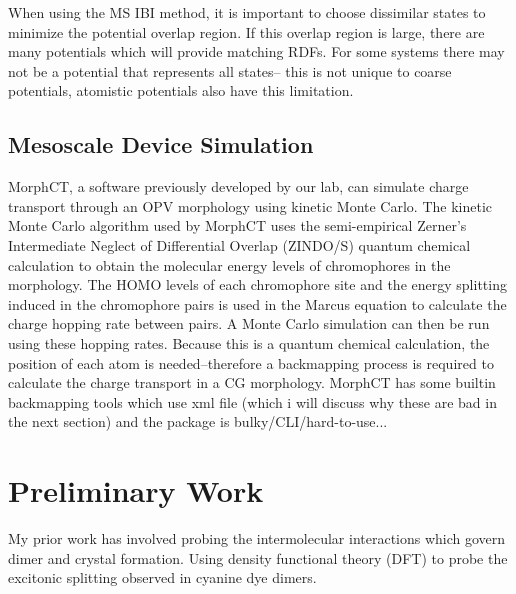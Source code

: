 When using the MS IBI method, it is important to choose dissimilar states to minimize the potential overlap region.
If this overlap region is large, there are many potentials which will provide matching RDFs. %
For some systems there may not be a potential that represents all states-- this is not unique to coarse potentials, atomistic potentials also have this limitation.

\subsection*{Mesoscale Device Simulation}

MorphCT, a software previously developed by our lab, can simulate charge transport through an OPV morphology using kinetic Monte Carlo\cite{Miller2018a,MorphCT,morphct2.2}.
The kinetic Monte Carlo algorithm used by MorphCT uses the semi-empirical Zerner's Intermediate Neglect of Differential Overlap (ZINDO/S) quantum chemical calculation to obtain the molecular energy levels of chromophores in the morphology.
The HOMO levels of each chromophore site and the energy splitting induced in the chromophore pairs is used in the Marcus equation to calculate the charge hopping rate between pairs.
A Monte Carlo simulation can then be run using these hopping rates.
Because this is a quantum chemical calculation, the position of each atom is needed--therefore a backmapping process is required to calculate the charge transport in a CG morphology.
MorphCT has some builtin backmapping tools which use xml file (which i will discuss why these are bad in the next section) and the package is bulky/CLI/hard-to-use...

\section*{Preliminary Work}
My prior work has involved probing the intermolecular interactions which govern dimer and crystal formation.
Using density functional theory (DFT) to probe the excitonic splitting observed in cyanine dye dimers\cite{Fothergill2018}.


